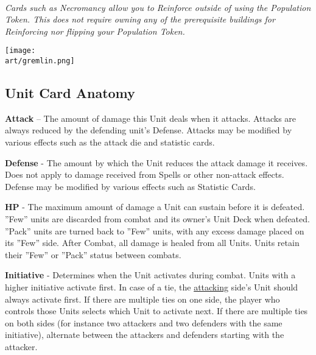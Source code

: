 \begin{multicols*}{2}
\bigskip

\begin{center}
  \\
  \footnotesize\textit{
    Cards such as Necromancy allow you to Reinforce outside of using the Population Token.
    This does not require owning any of the prerequisite buildings for Reinforcing nor flipping your Population Token.
  }
\end{center}

\vfill

\hspace{3.5em}
\texttt{[image: \\art/gremlin.png]}

\clearpage

\end{multicols*}
\begin{multicols}{2}
\subsection*{Unit Card Anatomy}

\vspace{0pt}

\textbf{Attack} – The amount of damage this Unit deals when it attacks.
Attacks are always reduced by the defending unit's Defense.
Attacks may be modified by various effects such as the attack die and statistic cards.\par
\textbf{Defense} - The amount by which the Unit reduces the attack damage it receives.
Does not apply to damage received from Spells or other non-attack effects.
Defense may be modified by various effects such as Statistic Cards.\par
\textbf{\hypertarget{HP}{HP}} - The maximum amount of damage a Unit can sustain before it is defeated.
”Few” units are discarded from combat and its owner's Unit Deck when defeated.
”Pack” units are turned back to ”Few” units, with any excess damage placed on its ”Few” side.
After Combat, all damage is healed from all Units.
Units retain their ”Few” or ”Pack” status between combats.\par
{\hypertarget{Initiative}{\textbf{Initiative}}} - Determines when the Unit activates during combat.
Units with a higher initiative activate first.
In case of a tie, the \hyperlink{Combatterminology}{attacking} side's Unit should always activate first.
If there are multiple ties on one side, the player who controls those Units selects which Unit to activate next.
If there are multiple ties on both sides (for instance two attackers and two defenders with the same initiative), alternate between the attackers and defenders starting with the attacker.\par
\bigskip


\end{multicols}
